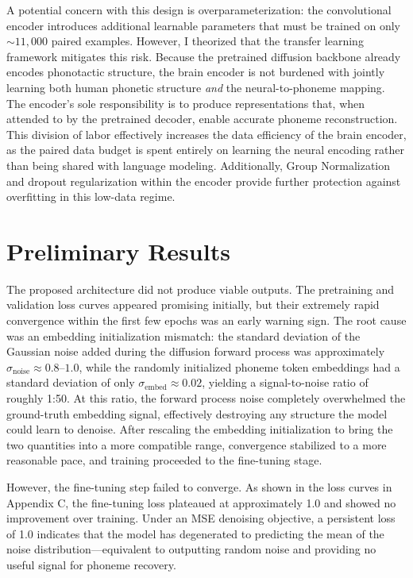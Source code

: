 \documentclass{article}
\begin{document}
A potential concern with this design is overparameterization: the
convolutional encoder introduces additional learnable parameters that
must be trained on only ${\sim}11{,}000$ paired examples.  However,
I theorized that the transfer learning framework mitigates this risk.  Because the
pretrained diffusion backbone already encodes phonotactic structure,
the brain encoder is not burdened with jointly learning both human
phonetic structure \emph{and} the neural-to-phoneme mapping.  The
encoder's sole responsibility is to produce representations that, when
attended to by the pretrained decoder, enable accurate phoneme
reconstruction.  This division of labor effectively increases the
data efficiency of the brain encoder, as the paired data budget is
spent entirely on learning the neural encoding rather than being
shared with language modeling.  Additionally, Group Normalization
\cite{wu2018groupnorm} and dropout regularization within the encoder
provide further protection against overfitting in this low-data
regime.

\section{Preliminary Results}

The proposed architecture did not produce viable outputs. The pretraining and validation
loss curves appeared promising initially, but their extremely rapid convergence within the
first few epochs was an early warning sign. The root cause was an embedding initialization
mismatch: the standard deviation of the Gaussian noise added during the diffusion forward
process was approximately $\sigma_{\text{noise}} \approx 0.8$--$1.0$, while the randomly
initialized phoneme token embeddings had a standard deviation of only $\sigma_{\text{embed}}
\approx 0.02$, yielding a signal-to-noise ratio of roughly 1:50. At this ratio, the forward
process noise completely overwhelmed the ground-truth embedding signal, effectively
destroying any structure the model could learn to denoise. After rescaling the embedding
initialization to bring the two quantities into a more compatible range, convergence
stabilized to a more reasonable pace, and training proceeded to the fine-tuning stage.

However, the fine-tuning step failed to converge. As shown in the loss curves in Appendix C, the
fine-tuning loss plateaued at approximately 1.0 and showed no improvement over training.
Under an MSE denoising objective, a persistent loss of 1.0 indicates that the model has
degenerated to predicting the mean of the noise distribution---equivalent to outputting
random noise and providing no useful signal for phoneme recovery.
\end{document}
